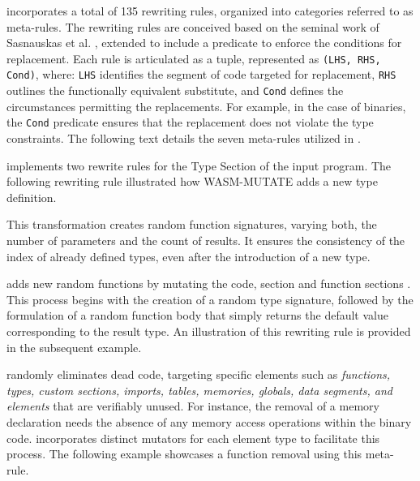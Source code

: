 





\tool incorporates a total of 135 rewriting rules, organized into categories referred to as meta-rules. 
The rewriting rules are conceived based on the seminal work of Sasnauskas et al. \cite{2017arXiv171104422S}, extended to include a predicate to enforce the conditions for replacement. 
Each rule is articulated as a tuple, represented as \texttt{(LHS, RHS, Cond)}, where: \texttt{LHS} identifies the segment of code targeted for replacement, \texttt{RHS} outlines the functionally equivalent substitute, and \texttt{Cond} defines the circumstances permitting the replacements.
For example, in the case of \Wasm binaries, the \texttt{Cond} predicate ensures that the replacement does not violate the type constraints. 
The following text details the seven meta-rules utilized in \tool.


\tool implements two rewrite rules for the Type Section of the input \Wasm program.
The following rewriting rule illustrated how WASM-MUTATE adds a new type definition. 



This transformation creates random function signatures, varying both, the number of parameters and the count of results. 
It ensures the consistency of the index of already defined types, even after the introduction of a new type.

\tool adds new random functions by mutating the code, section and function sections . 
This process begins with the creation of a random type signature, followed by the formulation of a random function body that simply returns the default value corresponding to the result type. 
An illustration of this rewriting rule is provided in the subsequent example.



 \tool randomly eliminates dead code, targeting specific elements such as \emph{functions, types, custom sections, imports, tables, memories, globals, data segments, and elements} that are verifiably unused. 
For instance, the removal of a memory declaration needs the absence of any memory access operations within the binary code. 
\tool incorporates distinct mutators for each element type to facilitate this process.
The following example showcases a function removal using this meta-rule.



